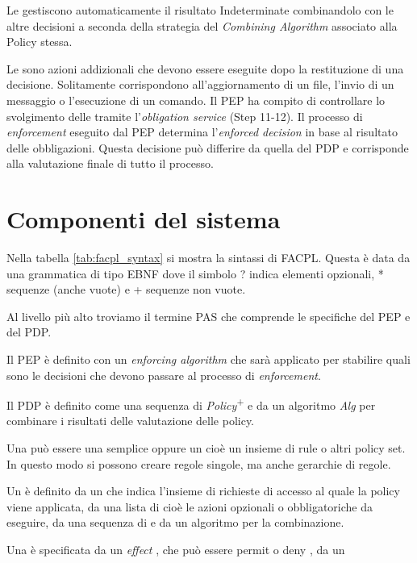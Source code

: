 Le \ePolicy gestiscono automaticamente il risultato Indeterminate combinandolo con le altre decisioni
a seconda della strategia del \emph{Combining Algorithm} associato alla Policy stessa.\par
Le \eObligations sono azioni addizionali che devono essere eseguite dopo la restituzione di una decisione.
Solitamente corrispondono all'aggiornamento di un file, l'invio di un messaggio o l'esecuzione di un comando.
Il \ac{PEP} ha compito di controllare lo svolgimento delle \eObligations tramite l'\emph{obligation service} (Step 11-12).
Il processo di \emph{enforcement} eseguito dal \ac{PEP} determina l'\emph{enforced decision} in base al risultato delle obbligazioni.
Questa decisione può differire da quella del \ac{PDP} e corrisponde alla valutazione finale di tutto il processo.


\section{Componenti del sistema}
\label{sub:Componenti del sistema}
Nella tabella \ref{tab:facpl_syntax} si mostra la sintassi di \ac{FACPL}. Questa è data da una grammatica di tipo \ac{EBNF} dove il simbolo ? indica
elementi opzionali, * sequenze (anche vuote) e + sequenze non vuote.\par
Al livello più alto troviamo il termine  \ac{PAS} che comprende le specifiche del \ac{PEP} e del \ac{PDP}.\par
Il \ac{PEP} è definito con un \emph{enforcing algorithm} che sarà applicato per stabilire quali sono le decisioni che devono
passare al processo di \emph{enforcement}.\par
Il \ac{PDP} è definito come una sequenza di \emph{Policy}\textsuperscript{+} e da un algoritmo \emph{Alg} per combinare i
risultati delle valutazione delle policy.\par
{\label{Sintassi di FACPL}}
Una \ePolicy può essere una \eRule semplice oppure un \ePolicySet cioè un insieme di rule o altri
policy set. In questo modo si possono creare regole singole, ma anche gerarchie di regole.\par
Un \ePolicySet è definito da un \etarget che indica l'insieme di richieste di accesso al quale la policy
viene applicata, da una lista di \eObligations cioè le azioni opzionali o obbligatoriche da eseguire, da una
sequenza di \ePolicy e da un algoritmo per la combinazione.\par
Una \eRule  è specificata da un \emph{effect} , che può essere permit o deny , da un \etarget
